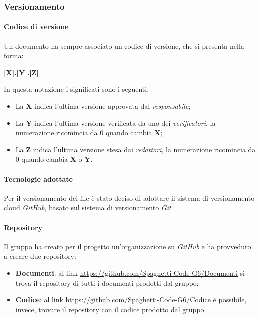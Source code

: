 \subsubsection{Versionamento}
\label{ssub:versionamento}

\paragraph{Codice di versione}
\label{par:codice_versione}

Un documento ha sempre associato un codice di versione, che si presenta nella forma:
\begin{center}
    \textbf{[X].[Y].[Z]}
\end{center}
In questa notazione i significati sono i seguenti:
\begin{itemize}
    \item La \textbf{X} indica l'ultima versione approvata dal \emph{responsabile};
    \item La \textbf{Y} indica l'ultima versione verificata da uno dei \emph{verificatori}, la numerazione ricomincia 
    da 0 quando cambia \textbf{X};
    \item La \textbf{Z} indica l'ultima versione stesa dai \emph{redattori}, la numerazione ricomincia da 0 quando 
    cambia \textbf{X} o \textbf{Y}.
\end{itemize}

\paragraph{Tecnologie adottate}
\label{par:tecnologie}

Per il versionamento dei file è stato deciso di adottare il sistema di versionamento cloud \emph{GitHub}, basato sul 
sistema di versionamento \emph{Git}.

\paragraph{Repository}
\label{par:repo}

Il gruppo ha creato per il progetto un'organizzazione su \emph{GitHub} e ha provveduto a creare due repository:
\begin{itemize}
    \item \textbf{Documenti}: al link \url{https://github.com/Spaghetti-Code-G6/Documenti} si trova il repository di 
    tutti i documenti prodotti dal gruppo;
    \item \textbf{Codice}: al link \url{https://github.com/Spaghetti-Code-G6/Codice} è possibile, invece, trovare il 
    repository con il codice prodotto dal gruppo.
\end{itemize}

